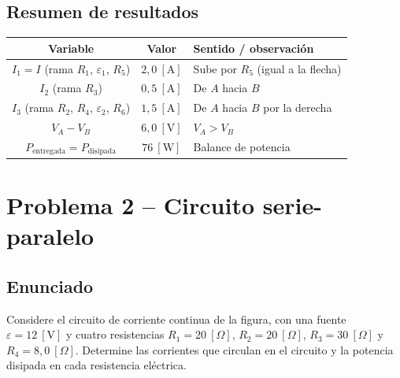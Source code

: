 \documentclass[12pt,letterpaper]{article}
\begin{document}
\subsection*{Resumen de resultados}

\begin{center}
\renewcommand{\arraystretch}{1.2}
\begin{tabular}{|c|c|l|}
\hline
\textbf{Variable} & \textbf{Valor} & \textbf{Sentido / observaci\'on} \\
\hline
$I_1 = I$ (rama $R_1$, $\varepsilon_1$, $R_5$) & $2{,}0\ [\text{A}]$ & Sube por $R_5$ (igual a la flecha) \\
$I_2$ (rama $R_3$)                            & $0{,}5\ [\text{A}]$ & De $A$ hacia $B$ \\
$I_3$ (rama $R_2$, $R_4$, $\varepsilon_2$, $R_6$) & $1{,}5\ [\text{A}]$ & De $A$ hacia $B$ por la derecha \\
\hline
$V_A - V_B$ & $6{,}0\ [\text{V}]$ & $V_A > V_B$ \\
$P_{\text{entregada}} = P_{\text{disipada}}$ & $76\ [\text{W}]$ & Balance de potencia \\
\hline
\end{tabular}
\end{center}

\newpage

\section*{Problema 2 -- Circuito serie-paralelo}

\subsection*{Enunciado}

Considere el circuito de corriente continua de la figura, con una fuente
$\varepsilon = 12\ [\text{V}]$ y cuatro resistencias
$R_1 = 20\ [\Omega]$, $R_2 = 20\ [\Omega]$, $R_3 = 30\ [\Omega]$ y $R_4 = 8{,}0\ [\Omega]$.
Determine las corrientes que circulan en el circuito y la potencia disipada en cada
resistencia el\'ectrica.
\end{document}
